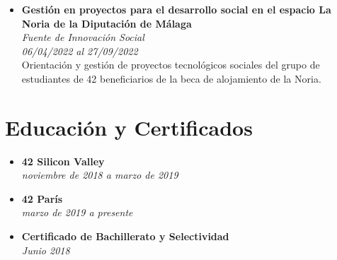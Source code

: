 \documentclass[11pt, oneside, a4paper, titlepage]{article}
\begin{document}
\begin{tcolorbox}
\begin{minipage}[t]{11cm}
\begin{tcolorbox}[grow to right
		by=0.75cm,colframe=white,colback=white]
\begin{itemize}
{					Gestión de picos de hasta 160 alumnos y los 300 imacs
					a disposición de estos en el espacio de trabajo.
				}
				\item
				{
					\textbf{Gestión en proyectos para el desarrollo
						social en el espacio La Noria de la Diputación de
						Málaga} \\
					\emph{Fuente de Innovación Social} \\
					\emph{06/04/2022 al 27/09/2022} \\
					Orientación y gestión de proyectos tecnológicos
					sociales del grupo de estudiantes de 42 beneficiarios de la
					beca de alojamiento de la Noria.
				}
			\end{itemize}
			
			\section{Educación y Certificados}
			\begin{itemize}
				\item
				{
					\textbf{42 Silicon Valley } \\
					\emph{noviembre de 2018 a  marzo de 2019} \\
				}
				\item
				{
					\textbf{42 París} \\
					\emph{marzo de 2019 a presente} \\
				}
				\item
				{
					\textbf{Certificado de Bachillerato y Selectividad} \\
					\emph{Junio 2018} \\
				}
			\end{itemize}
		\end{tcolorbox}
	\end{minipage}
\end{tcolorbox}
\end{document}
